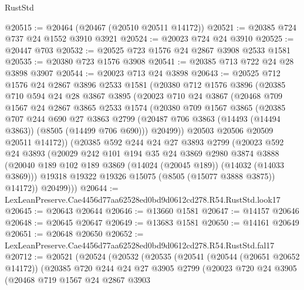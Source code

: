 \begin{lexlean}{RustStd}
\begin{coremodule}
@20515 := @20464 (@20467 (@20510 @20511 @14172))
@20521 := @20385 @724 @737 @24 @1552 @3910 @3921
@20524 := @20023 @724 @24 @3910
@20525 := @20447 @703
@20532 := @20525 @723 @1576 @24 @2867 @3908 @2533 @1581
@20535 := @20380 @723 @1576 @3908
@20541 := @20385 @713 @722 @24 @28 @3898 @3907
@20544 := @20023 @713 @24 @3898
@20643 := @20525
    @712
    @1576
    @24
    @2867
    @3896
    @2533
    @1581
    (@20380
      @712
      @1576
      @3896
      (@20385
        @710
        @594
        @24
        @28
        @3867
        @3895
        (@20023
          @710
          @24
          @3867
          (@20468
            @709
            @1567
            @24
            @2867
            @3865
            @2533
            @1574
            (@20380
              @709
              @1567
              @3865
              (@20385
                @707
                @244
                @690
                @27
                @3863
                @2799
                (@20487 @706 @3863 (@14493 (@14494 @3863)) (@8505 (@14499 @706 @690)))
                @20499))
            @20503
            @20506
            @20509
            @20511
            @14172))
        (@20385
          @592
          @244
          @24
          @27
          @3893
          @2799
          (@20023
            @592
            @24
            @3893
            (@20029
              @242
              @101
              @194
              @35
              @24
              @3869
              @2980
              @3874
              @3888
              (@20040 @189 @102 @189 @3869 (@14024 (@20045 @189)) (@14032 (@14033 @3869)))
              @19318
              @19322
              @19326
              @15075
              (@8505 (@15077 @3888 @3875))
              @14172))
          @20499)))
@20644 := LexLeanPreserve.Cae4456d77aa62528ed0bd9d0612cd278.R54.RustStd.look17
@20645 := @20643 @20644
@20646 := @13660 @1581
@20647 := @14157 @20646
@20648 := @20645 @20647
@20649 := @13683 @1581
@20650 := @14161 @20649
@20651 := @20648 @20650
@20652 := LexLeanPreserve.Cae4456d77aa62528ed0bd9d0612cd278.R54.RustStd.fal17
@20712 := @20521
    (@20524
      (@20532
        (@20535
          (@20541
            (@20544 (@20651 @20652 @14172))
            (@20385
              @720
              @244
              @24
              @27
              @3905
              @2799
              (@20023
                @720
                @24
                @3905
                (@20468
                  @719
                  @1567
                  @24
                  @2867
                  @3903

\end{coremodule}
\end{lexlean}
